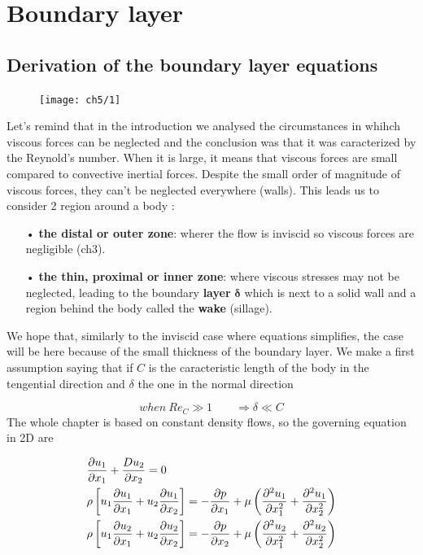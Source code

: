 
\chapter{Boundary layer}

\section{Derivation of the boundary layer equations}
	\begin{figure}
	\vspace{-5mm}
	\texttt{[image: ch5/1]}
	\end{figure}
	Let's remind that in the introduction we analysed the circumstances in whihch viscous forces can be neglected and the conclusion was that it was caracterized by the Reynold's number. When it is large, it means that viscous forces are small compared to convective inertial forces. Despite the small order of magnitude of viscous forces, they can't be neglected everywhere (walls). This leads us to consider 2 region around a body : 
	\ \\
	\begin{itemize}
		\item[•] \textbf{the distal or outer zone}: wherer the flow is inviscid so viscous forces are negligible (ch3). 
		\item[•] \textbf{the thin, proximal or inner zone}: where viscous stresses may not be neglected, leading to the boundary \textbf{layer} $\mathbf{\delta}$ which is next to a solid wall and a region behind the body called the \textbf{wake} (sillage). \\
	\end{itemize}
	
	We hope that, similarly to the inviscid case where equations simplifies, the case will be here because of the small thickness of the boundary layer. We make a first assumption saying that if $C$ is the caracteristic length of the body in the tengential direction and $\delta$ the one in the normal direction

	\begin{equation}
		when \ Re_C \gg 1 \qquad \Rightarrow \delta \ll C
	\end{equation}
	The whole chapter is based on constant density flows, so the governing equation in 2D are
	
	\begin{equation}
	\begin{aligned}
		&\frac{\partial u_1}{\partial x_1} + \frac{D u_2}{\partial x_2} = 0\\
		&\rho \left[ u_1 \frac{\partial u_1}{\partial x_1} + u_2 \frac{\partial u_1}{\partial x_2} \right] = -\frac{\partial p}{\partial x_1} + \mu \left( \frac{\partial ^2 u_1}{\partial x_1^2} + \frac{\partial ^2 u_1}{\partial x_2^2} \right) \\
		&\rho \left[ u_1 \frac{\partial u_2}{\partial x_1} + u_2 \frac{\partial u_2}{\partial x_2} \right] = -\frac{\partial p}{\partial x_2} + \mu \left( \frac{\partial ^2 u_2}{\partial x_1^2} + \frac{\partial ^2 u_2}{\partial x_2^2} \right)
	\end{aligned}
	\end{equation}
	
